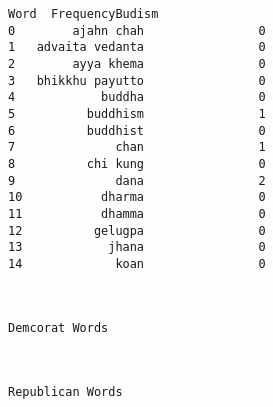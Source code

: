 \documentclass[11pt]{article}
\begin{document}
            \begin{tcolorbox}[breakable, size=fbox, boxrule=.5pt, pad at break*=1mm, opacityfill=0]
\begin{Verbatim}[commandchars=\\\{\}]
               Word  FrequencyBudism
0        ajahn chah                0
1   advaita vedanta                0
2        ayya khema                0
3   bhikkhu payutto                0
4            buddha                0
5          buddhism                1
6          buddhist                0
7              chan                1
8          chi kung                0
9              dana                2
10           dharma                0
11           dhamma                0
12          gelugpa                0
13            jhana                0
14             koan                0
\end{Verbatim}
\end{tcolorbox}
        
    \begin{center}
    \end{center}
    { \hspace*{\fill} \\}
    
    \begin{Verbatim}[commandchars=\\\{\}]
Demcorat Words
    \end{Verbatim}

    \begin{center}
    \end{center}
    { \hspace*{\fill} \\}
    
    \begin{Verbatim}[commandchars=\\\{\}]
Republican Words
    \end{Verbatim}

    \begin{center}
    \end{center}
    { \hspace*{\fill} \\}
    
\end{document}
